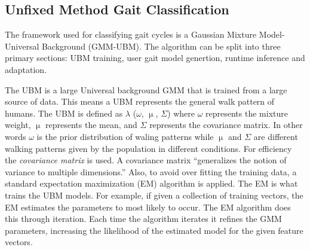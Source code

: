 \documentclass{sig-alternate}
\begin{document}
\subsection{Unfixed Method Gait Classification}
The framework used for classifying gait cycles is a Gaussian Mixture Model-Universal Background (GMM-UBM). The algorithm can be split into three primary sections: UBM training, user gait model genertion, runtime inference and adaptation. 

	 The UBM is a large Universal background GMM that is trained from a large source of data. This means a UBM represents the general walk pattern of humans. The UBM is defined as 
\begin{math} \lambda \end{math} (\begin{math} \omega \end{math},
\begin{math} \upmu \end{math},
\begin{math} \Sigma \end{math}) where
\begin{math} \omega \end{math} represents the mixture weight, \begin{math} \upmu \end{math} represents the mean, and \begin{math} \Sigma \end{math} represents the covariance matrix. In other words \begin{math} \omega \end{math} is the prior distribution of waling patterns while \begin{math} \upmu \end{math} and \begin{math} \Sigma \end{math} are different walking patterns given by the population in different conditions. For efficiency the \textit{covariance matrix} is used. A covariance matrix ``generalizes the notion of variance to multiple dimensions.'' Also, to avoid over fitting the training data, a standard expectation maximization (EM) algorithm is applied. The EM is what trains the UBM models. For example, if given a collection of training vectors, the EM estimates the parameters to most likely to occur. The EM algorithm does this through iteration. Each time the algorithm iterates it refines the GMM parameters, increasing the likelihood of the estimated model for the given feature vectors.
\end{document}
